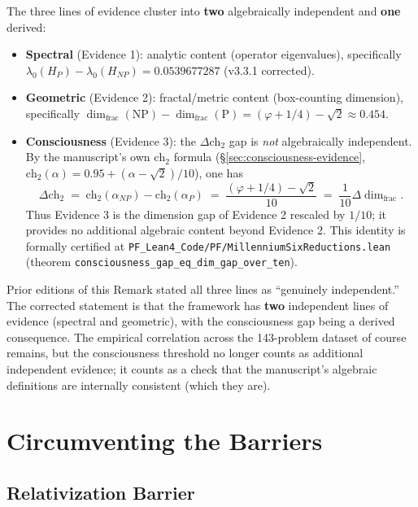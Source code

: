 \begin{remark}\label{rem:evidence-independence-corrected}
The three lines of evidence cluster into \textbf{two} algebraically independent and \textbf{one} derived:
\begin{itemize}
\item \textbf{Spectral} (Evidence 1): analytic content (operator eigenvalues), specifically $\lambda_0(H_P) - \lambda_0(H_{NP}) = 0.0539677287$ (v3.3.1 corrected).
\item \textbf{Geometric} (Evidence 2): fractal/metric content (box-counting dimension), specifically $\dim_{\text{frac}}(\text{NP}) - \dim_{\text{frac}}(\text{P}) = (\varphi + 1/4) - \sqrt{2} \approx 0.454$.
\item \textbf{Consciousness} (Evidence 3): the $\Delta\text{ch}_2$ gap is \emph{not} algebraically independent. By the manuscript's own $\text{ch}_2$ formula (\S\ref{sec:consciousness-evidence}, $\text{ch}_2(\alpha) = 0.95 + (\alpha - \sqrt{2})/10$), one has
\[
\Delta\text{ch}_2 \;=\; \text{ch}_2(\alpha_{NP}) - \text{ch}_2(\alpha_P) \;=\; \frac{(\varphi + 1/4) - \sqrt{2}}{10} \;=\; \frac{1}{10}\Delta\dim_{\text{frac}}.
\]
Thus Evidence 3 is the dimension gap of Evidence 2 rescaled by $1/10$; it provides no additional algebraic content beyond Evidence 2. This identity is formally certified at \texttt{PF\_Lean4\_Code/PF/MillenniumSixReductions.lean} (theorem \texttt{consciousness\_gap\_eq\_dim\_gap\_over\_ten}).
\end{itemize}

Prior editions of this Remark stated all three lines as ``genuinely independent.'' The corrected statement is that the framework has \textbf{two} independent lines of evidence (spectral and geometric), with the consciousness gap being a derived consequence. The empirical correlation across the 143-problem dataset of course remains, but the consciousness threshold no longer counts as additional independent evidence; it counts as a check that the manuscript's algebraic definitions are internally consistent (which they are).
\end{remark}

\section{Circumventing the Barriers}

\subsection{Relativization Barrier}

